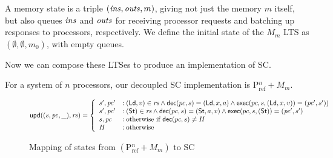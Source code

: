 A memory state is a triple $(\mathit{ins}, \mathit{outs}, m)$, giving not just the
memory $m$ itself, but also queues $\mathit{ins}$ and $\mathit{outs}$ for receiving
processor requests and batching up responses to processors,
respectively.  We define the initial state of the $M_m$ LTS as
$(\emptyset, \emptyset, m_0)$, with empty queues.


Now we can compose these LTSes to produce an implementation of SC. 

For a system of $n$ processors, our decoupled SC implementation is
$\text{P$^n_{\text{ref}}$} + M_m$.

\begin{figure*}[t]
\begin{displaymath}
\mathsf{upd}((s, \mathit{pc}, \_), \mathit{rs}) =
\left\{
\begin{array}{ll}
s', \mathit{pc}' &: (\mathsf{Ld}, v) \in \mathit{rs} \wedge \mathsf{dec}(pc, s) = (\mathsf{Ld}, x, a) \wedge
\mathsf{exec}(pc, s, (\mathsf{Ld}, x, v)) = (\mathit{pc}', s'))\\
s', \mathit{pc}' &: (\mathsf{St}) \in \mathit{rs} \wedge \mathsf{dec}(pc, s) = (\mathsf{St}, a, v) \wedge
\mathsf{exec}(pc, s, (\mathsf{St})) = (\mathit{pc}', s')\\
s, \mathit{pc} &: \text{otherwise if } \mathsf{dec}(pc,s) \neq H\\
H &: \text{otherwise}
\end{array}
\right.
\end{displaymath}
\caption{Mapping of states from $(\text{P$^n_\text{ref}$} + M_m)$ to SC}
\label{smap}
\end{figure*}

